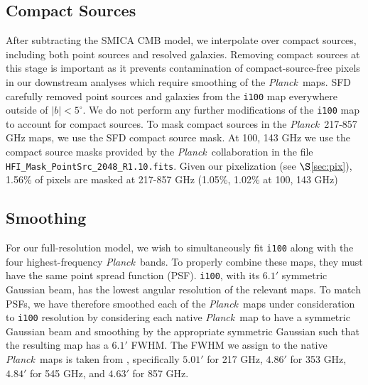 \documentclass{emulateapj}
\newcommand{\PLANCK}{{\it Planck}}
\begin{document}
\subsection{Compact Sources}
\label{sec:ptsrc}
After subtracting the SMICA CMB model, we interpolate over compact sources, 
including both point sources and resolved galaxies. Removing compact sources at
this stage is important as it prevents contamination of compact-source-free 
pixels in our downstream analyses which require smoothing of the \PLANCK~maps. 
SFD carefully removed point sources and galaxies from the \verb|i100| map 
everywhere outside of $|b|$$<$$5^{\circ}$. We do not perform any further 
modifications of the \verb|i100| map to account for compact sources. To mask 
compact sources in the \PLANCK~217-857 GHz maps, we use the SFD compact source 
mask. At 100, 143 GHz we use the compact source masks provided by the 
\PLANCK~collaboration in the file \verb|HFI_Mask_PointSrc_2048_R1.10.fits|. 
Given our pixelization (see $\S$\ref{sec:pix}), 1.56\% of pixels are masked 
at 217-857 GHz (1.05\%, 1.02\% at 100, 143 GHz) 


\subsection{Smoothing}
\label{sec:smth}
For our full-resolution model, we wish to simultaneously fit \verb|i100| along 
with the four highest-frequency \PLANCK~bands. To properly combine these maps, 
they must have the same point spread function (PSF). \verb|i100|, with its 
$6.1'$ symmetric Gaussian beam, has the lowest angular resolution of the 
relevant maps. To match PSFs, we have therefore smoothed each of the 
\PLANCK~maps under consideration to \verb|i100| resolution by considering each 
native \PLANCK~map to have a symmetric Gaussian beam and smoothing by the 
appropriate symmetric Gaussian such that the resulting map has a  $6.1'$ FWHM. 
The FWHM we assign to the native \PLANCK~maps is taken from \cite{planckbeam}, 
specifically $5.01'$ for 217 GHz, $4.86'$ for 353 GHz, $4.84'$ for 545 GHz, and
 $4.63'$ for 857 GHz.
\end{document}
